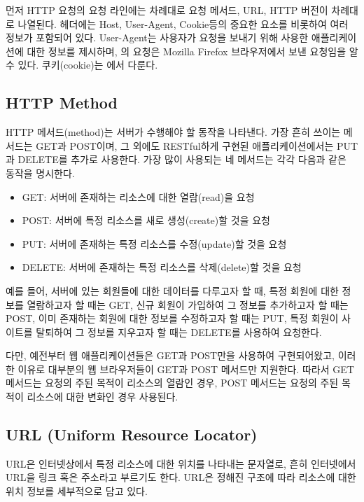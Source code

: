 먼저 HTTP 요청의 요청 라인에는 차례대로 요청 메서드, URL, HTTP 버전이 차례대로 나열된다. 헤더에는 Host, User-Agent, Cookie등의 중요한 요소를 비롯하여 여러 정보가 포함되어 있다. User-Agent는 사용자가 요청을 보내기 위해 사용한 애플리케이션에 대한 정보를 제시하며, 의 요청은 Mozilla Firefox 브라우저에서 보낸 요청임을 알 수 있다. 쿠키(cookie)는 에서 다룬다.

\subsection*{HTTP Method}

HTTP 메서드(method)는 서버가 수행해야 할 동작을 나타낸다. 가장 흔히 쓰이는 메서드는 GET과 POST이며, 그 외에도 RESTful하게 구현된 애플리케이션에서는 PUT과 DELETE를 추가로 사용한다. 가장 많이 사용되는 네 메서드는 각각 다음과 같은 동작을 명시한다.

\begin{itemize}
    \item GET: 서버에 존재하는 리소스에 대한 열람(read)을 요청
    \item POST: 서버에 특정 리소스를 새로 생성(create)할 것을 요청
    \item PUT: 서버에 존재하는 특정 리소스를 수정(update)할 것을 요청
    \item DELETE: 서버에 존재하는 특정 리소스를 삭제(delete)할 것을 요청
\end{itemize}

예를 들어, 서버에 있는 회원들에 대한 데이터를 다루고자 할 때, 특정 회원에 대한 정보를 열람하고자 할 때는 GET, 신규 회원이 가입하여 그 정보를 추가하고자 할 때는 POST, 이미 존재하는 회원에 대한 정보를 수정하고자 할 때는 PUT, 특정 회원이 사이트를 탈퇴하여 그 정보를 지우고자 할 때는 DELETE를 사용하여 요청한다.

다만, 예전부터 웹 애플리케이션들은 GET과 POST만을 사용하여 구현되어왔고, 이러한 이유로 대부분의 웹 브라우저들이 GET과 POST 메서드만 지원한다. 따라서 GET 메서드는 요청의 주된 목적이 리소스의 열람인 경우, POST 메서드는 요청의 주된 목적이 리소스에 대한 변화인 경우 사용된다.

\subsection*{URL (Uniform Resource Locator)}
URL은 인터넷상에서 특정 리소스에 대한 위치를 나타내는 문자열로, 흔히 인터넷에서 URL을 링크 혹은 주소라고 부르기도 한다. URL은 정해진 구조에 따라 리소스에 대한 위치 정보를 세부적으로 담고 있다.

